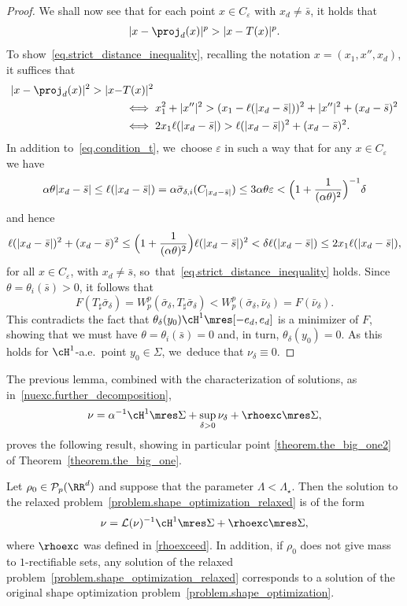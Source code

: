 \begin{proof}
We shall now see that for each point $x \in C_\varepsilon$ with $x_d\neq \bar s$, it holds that
\begin{equation}\label{eq.strict_distance_inequality}
|x - \proj_d(x)|^p > |x - T(x)|^p.
\end{equation}
To show~\eqref{eq.strict_distance_inequality}, recalling the notation $x = (x_1, x'', x_d)$, it suffices that
\begin{align*}
|x - \proj_d(x)|^2 > |x- & T(x)|^2
\\
&\iff
x_1^2 + |x''|^2 >
(x_1-\ell(|x_d-\bar s|))^2+|x''|^2 + (x_d-\bar s)^2\\
&\iff
2x_1\ell(|x_d-\bar s|) > \ell(|x_d-\bar s|)^2 + (x_d-\bar s)^2.
\end{align*}
In addition to~\eqref{eq.condition_t}, we~choose $\varepsilon$ in such a way that for any $x \in C_\varepsilon$ we have
\[ \alpha\theta |x_d-\bar s|
\le
\ell(|x_d-\bar s|) = \alpha \bar \sigma_{\delta, i}(C_{|x_d-\bar s|})
\le 3\alpha\theta\varepsilon < \Bigl(1 +\frac{1}{(\alpha\theta)^2}\Bigr)^{-1}\delta
\]
and hence
\[
\ell(|x_d-\bar s|)^2+(x_d-\bar s)^2 \le
\Bigl(1 + \frac{1}{(\alpha\theta)^2} \Bigr)
\ell(|x_d-\bar s|)^2
< \delta \ell(|x_d-\bar s|)
\le 2x_1 \ell(|x_d-\bar s|),
\]
for all $x \in C_{\varepsilon}$, with $x_d \neq \bar s$, so~that~\eqref{eq.strict_distance_inequality} holds.
Since $\theta=\theta_i(\bar s)>0$, it follows that
\[
F(T_\sharp \bar \sigma_{\delta})=
W_p^p(\bar \sigma_{\delta} , T_\sharp\bar \sigma_{\delta})
<
W_p^p(\bar \sigma_{\delta}, \bar \nu_{\delta})
=
F(\bar \nu_{\delta}).
\]
This contradicts the fact that $\theta_\delta(y_0) \cH^1\mres [-e_d, e_d]$ is a minimizer of $F$, showing that we must have $\theta=\theta_i(\bar s)=0$ and, in turn, $\theta_\delta(y_0)=0$.
As this holds for $\cH^1$-a.e.~point $y_0 \in \Sigma$, we~deduce that $\nu_\delta \equiv 0$.
\end{proof}

The previous lemma, combined with the characterization of solutions, as in~\eqref{nuexc.further_decomposition},
\[
\nu = \alpha^{-1}\cH^1\mres \Sigma + \sup_{\delta > 0}\nu_\delta + \rhoexc\mres \Sigma,
\]
proves the following result, showing in particular point \eqref{theorem.the_big_one2} of Theorem~\ref{theorem.the_big_one}.

\begin{theorem}\label{theorem.inR2_density_is_1}
Let $\rho_0 \in \mathcal{P}_p(\RR^d)$ and suppose that the parameter $\Lambda < \Lambda_\star$. Then the solution to the relaxed problem~\eqref{problem.shape_optimization_relaxed} is of the form
\[
\nu =
\mathcal{L}(\nu)^{-1}\cH^1\mres \Sigma
+
\rhoexc\mres \Sigma,
\]
where $\rhoexc$ was defined in \eqref{rhoexceed}.
In addition, if $\rho_0$ does not give mass to $1$-rectifiable sets, any solution of the relaxed problem~\eqref{problem.shape_optimization_relaxed} corresponds to a solution of the original shape optimization problem~\eqref{problem.shape_optimization}.
\end{theorem}

